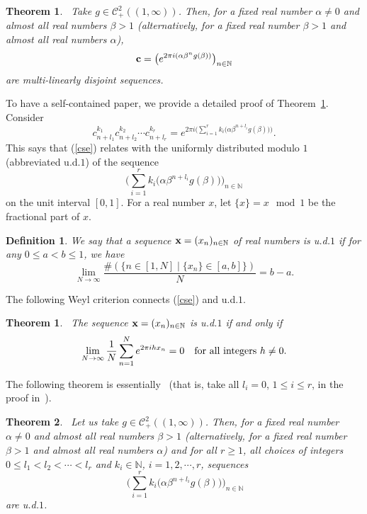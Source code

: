 \documentclass[12pt,letterpaper]{amsart}
\newtheorem {theorem}{Theorem}
\newtheorem {definition}{Definition}
\newtheorem{thmx}{Theorem}
\newcommand {\N} {{\mathbb N}}
\begin{document}
\medskip
\begin{theorem}~\label{mlds}
Take $g\in \mathcal{C}^{2}_{+}((1,\infty))$. Then, for a fixed real
number $\alpha\not=0$ and almost all real numbers $\beta>1$ 
(alternatively, for a fixed real number $\beta>1$ and almost all real numbers $\alpha$),
$$
{\bf c} =\big( e^{2\pi i (\alpha \beta^{n}g(\beta))}\big)_{n\in \N}
$$
are multi-linearly disjoint sequences.
\end{theorem}

To have a self-contained paper, we provide a detailed proof of Theorem~\ref{mlds}. 
Consider 
$$
c_{n+l_{1}}^{k_{1}} c_{n+l_{2}}^{k_{2}} \cdots c_{n+l_{r}}^{k_{r}} = e^{2\pi i \big( \sum_{i=1}^{r} k_{i} \big( \alpha \beta^{n+l_{i}} g(\beta)\big)\big)}.
$$
This says that (\ref{cse}) relates with the uniformly distributed modulo $1$ (abbreviated u.d.$1$) of the sequence 
$$
\Big( \sum_{i=1}^{r} k_{i} \big(\alpha \beta^{n+l_{i}} g(\beta)\big) \Big)_{n\in \N}
$$  
on the unit interval $[0,1]$. For a real number $x$, let $\{x\}=x \mod{1}$ be the fractional part of $x$.
 
\medskip
\begin{definition} 
We say that a sequence ${\bf x}=(x_{n})_{n\in \N}$ of real numbers is u.d.$1$ if for any $0\leq a<b\leq 1$,
we have
$$
\lim_{N\to \infty} \frac{\#(\{ n\in [1,N] \;|\; \{x_{n}\} \in [a,b]\})}{N}=b-a.
$$
 \end{definition}

\medskip
The following Weyl criterion connects (\ref{cse}) and u.d.$1$.

\medskip
\begin{thmx}~\label{wc}
The sequence ${\bf x}=(x_{n})_{n\in \N}$ is u.d.$1$ if and only if 
$$
\lim_{N\to \infty} \frac{1}{N} \sum_{n=1}^{N} e^{2\pi i h x_{n}} =0 \quad \hbox{for all integers $h\not=0$}.
$$
\end{thmx}

The following theorem is essentially~\cite[Theorem 1]{AJ} (that is, take all $l_{i}=0$, $1\leq i\leq r$, in the proof in~\cite{AJ}). 

\medskip
\begin{theorem}~\label{thmuni}
Let us take $g\in \mathcal{C}^{2}_{+}((1,\infty))$. Then, for a fixed real
number $\alpha\not=0$ and almost all real numbers $\beta>1$ 
(alternatively, for a fixed real number $\beta>1$ and almost all real numbers $\alpha$) and for all $r\geq 1$, all choices of integers $0\leq l_{1} <l_{2}< \cdots <l_{r}$ and $k_{i}\in \N$, $i=1, 2, \cdots, r$, sequences 
\begin{equation}~\label{main1eq}
\Big( \sum_{i=1}^{r} k_{i} \big( \alpha \beta^{n+l_{i}}g(\beta)\big) 
\Big)_{n\in \N}
\end{equation}
are u.d.$1$.  
\end{theorem}
\end{document}
